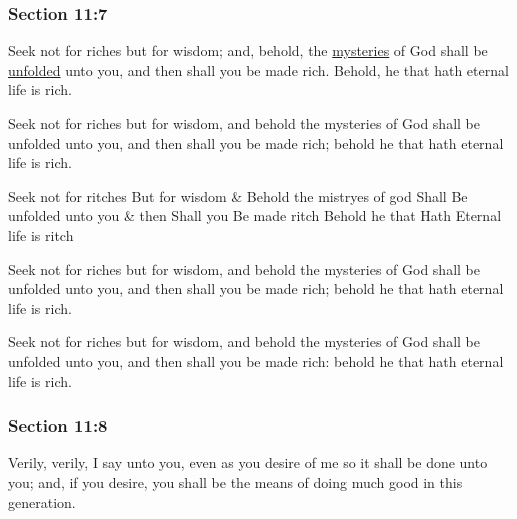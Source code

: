 	\subsubsection{Section 11:7} %
		\label{DC11-7}

		Seek not for riches but for wisdom; and, behold, the \hyperref[MYSTERY]{mysteries} of God shall be \hyperref[UNFOLD]{unfolded} unto you, and then shall you be made rich.  Behold, he that hath eternal life is rich.

		\begin{framed}
		\scriptsize
			\begin{compactdesc}
				\item[JSP] Seek not for riches but for wisdom, and behold the mysteries of God shall be unfolded unto you, and then shall you be made rich; behold he that hath eternal life is rich.
				\item[HS] Seek not for ritches But for wisdom \& Behold the mistryes of god Shall Be unfolded unto you \& then Shall you Be made ritch Behold he that Hath Eternal life is ritch
				\item[DC 1835] Seek not for riches but for wisdom, and behold the mysteries of God shall be unfolded unto you, and then shall you be made rich; behold he that hath eternal life is rich.
				\item[DC 1844] Seek not for riches but for wisdom, and behold the mysteries of God shall be unfolded unto you, and then shall you be made rich: behold he that hath eternal life is rich.
			\end{compactdesc}
		\end{framed}

	\subsubsection{Section 11:8} %
		\label{DC11-8}

		Verily, verily, I say unto you, even as you desire of me so it shall be done unto you; and, if you desire, you shall be the means of doing much good in this generation.

